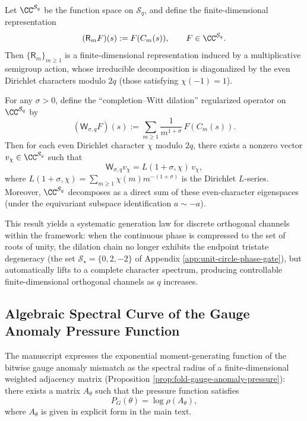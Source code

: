 Let \(\CC^{\mathcal{S}_q}\) be the function space on \(\mathcal{S}_q\), and define the finite-dimensional representation
\begin{equation}\label{eq:root-unit-Rm}
(\mathsf{R}_m F)(s):=F(C_m(s)),\qquad F\in\CC^{\mathcal{S}_q}.
\end{equation}
Then \(\{\mathsf{R}_m\}_{m\ge 1}\) is a finite-dimensional representation induced by a multiplicative semigroup action, whose irreducible decomposition is diagonalized by the even Dirichlet characters modulo \(2q\) (those satisfying \(\chi(-1)=1\)).

\begin{theorem}\label{thm:root-unit-character-diagonalization}
For any \(\sigma>0\), define the ``completion--Witt dilation'' regularized operator on \(\CC^{\mathcal{S}_q}\) by
\begin{equation}\label{eq:root-unit-W-sigma}
(\mathsf{W}_{\sigma,q}F)(s):=\sum_{m\ge 1}\frac{1}{m^{1+\sigma}}\,F(C_m(s)).
\end{equation}
Then for each even Dirichlet character \(\chi\) modulo \(2q\), there exists a nonzero vector \(v_\chi\in\CC^{\mathcal{S}_q}\) such that
\[
\mathsf{W}_{\sigma,q}v_\chi=L(1+\sigma,\chi)\,v_\chi,
\]
where \(L(1+\sigma,\chi)=\sum_{m\ge 1}\chi(m)m^{-(1+\sigma)}\) is the Dirichlet \(L\)-series. Moreover, \(\CC^{\mathcal{S}_q}\) decomposes as a direct sum of these even-character eigenspaces (under the equivariant subspace identification \(a\sim -a\)).
\end{theorem}

This result yields a systematic generation law for discrete orthogonal channels within the framework: when the continuous phase is compressed to the set of roots of unity, the dilation chain no longer exhibits the endpoint tristate degeneracy (the set \(\mathcal{S}_\star=\{0,2,-2\}\) of Appendix \ref{app:unit-circle-phase-gate}), but automatically lifts to a complete character spectrum, producing controllable finite-dimensional orthogonal channels as \(q\) increases.

\subsection{Algebraic Spectral Curve of the Gauge Anomaly Pressure Function}\label{subsec:gauge-pressure-algebraic-curve}

The manuscript expresses the exponential moment-generating function of the bitwise gauge anomaly mismatch as the spectral radius of a finite-dimensional weighted adjacency matrix (Proposition \ref{prop:fold-gauge-anomaly-pressure}): there exists a matrix \(A_\theta\) such that the pressure function satisfies
\[
P_G(\theta)=\log\rho(A_\theta),
\]
where \(A_\theta\) is given in explicit form in the main text.

